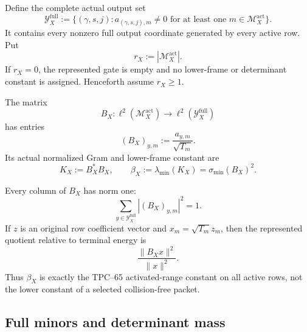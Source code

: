 Define the complete actual output set
\begin{equation}
 \mathcal Y_X^{\mathrm{full}}
 :=
 \{(\gamma,s,j):
   a_{(\gamma,s,j),m}\ne0
   \text{ for at least one }m\in\mathcal M_X^{\mathrm{act}}\}.
 \label{eq:tpc67-full-output-set}
\end{equation}
It contains every nonzero full output coordinate generated by every
active row.  Put
\[
 r_X:=|\mathcal M_X^{\mathrm{act}}|.
\]
If \(r_X=0\), the represented gate is empty and no lower-frame or
determinant constant is assigned.  Henceforth assume \(r_X\ge1\).

\begin{definition}
\label{def:tpc67-literal-B}
The matrix
\begin{equation}
 B_X:\ell^2(\mathcal M_X^{\mathrm{act}})
 \longrightarrow
 \ell^2(\mathcal Y_X^{\mathrm{full}})
 \label{eq:tpc67-B-map}
\end{equation}
has entries
\begin{equation}
 (B_X)_{y,m}:=\frac{a_{y,m}}{\sqrt{T_m}}.
 \label{eq:tpc67-normalized-B-entry}
\end{equation}
Its actual normalized Gram and lower-frame constant are
\begin{equation}
 K_X:=B_X^*B_X,
 \qquad
 \beta_X:=\lambda_{\min}(K_X)
          =\sigma_{\min}(B_X)^2.
 \label{eq:tpc67-full-Gram-and-beta}
\end{equation}
\end{definition}

Every column of \(B_X\) has norm one:
\begin{equation}
 \sum_{y\in\mathcal Y_X^{\mathrm{full}}}
 |(B_X)_{y,m}|^2=1.
 \label{eq:tpc67-unit-columns}
\end{equation}
If \(z\) is an original row coefficient vector and
\(x_m=\sqrt{T_m}z_m\), then the represented quotient relative to terminal
energy is
\[
 \frac{\|B_Xx\|^2}{\|x\|^2}.
\]
Thus \(\beta_X\) is exactly the TPC--65 activated-range constant on all
active rows, not the lower constant of a selected collision-free packet.

\subsection{Full minors and determinant mass}

